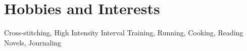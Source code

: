 \section{\sc Hobbies and Interests}
Cross-stitching, High Intensity Interval Training, Running, Cooking, Reading Novels, Journaling

